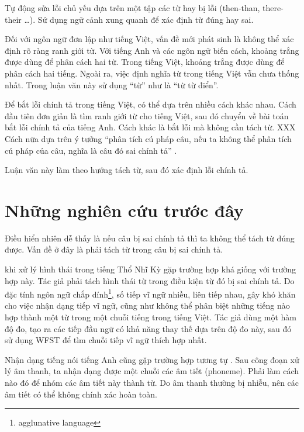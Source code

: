 \documentclass[a4paper]{book} %
\begin{document}
Tự động sửa lỗi chủ yếu dựa trên một tập các từ hay bị lỗi (then-than,
there-their \ldots). Sử dụng ngữ cảnh xung quanh để xác định từ đúng
hay sai.

Đối với ngôn ngữ đơn lập như tiếng Việt, vấn đề mới phát sinh là không
thể xác định rõ ràng ranh giới từ. Với tiếng Anh và các ngôn ngữ biến
cách, khoảng trắng được dùng để phân cách hai từ. Trong tiếng Việt,
khoảng trắng được dùng để phân cách hai tiếng. Ngoài ra, việc định
nghĩa từ trong tiếng Việt vẫn chưa thống nhất. Trong luận văn này sử
dụng ``từ'' như là ``từ từ điển''.

Để bắt lỗi chính tả trong tiếng Việt, có thể dựa trên nhiều cách khác
nhau. Cách đầu tiên đơn giản là tìm ranh giới từ cho tiếng Việt, sau
đó chuyển về bài toán bắt lỗi chính tả của tiếng Anh. Cách khác
là bắt lỗi mà không cần tách từ. XXX
Cách nữa dựa trên ý tưởng ``phân tích cú pháp câu, nếu ta không thể
phân tích cú pháp của câu, nghĩa là câu đó sai chính tả'' \cite{iccc}.

Luận văn này làm theo hướng tách từ, sau đó xác định lỗi chính tả.

\section{Những nghiên cứu trước đây}

Điều hiển nhiên dễ thấy là nếu câu bị sai chính tả thì ta không thể
tách từ đúng được. Vấn đề ở đây là phải tách từ trong câu bị sai chính
tả.

\cite{Oflazer} khi xử lý hình thái trong tiếng Thổ Nhĩ Kỳ gặp trường
hợp khá giống với trường hợp này. Tác giả phải tách hình thái từ
trong điều kiện từ đó bị sai chính tả. Do đặc tính
ngôn ngữ chắp dính\footnote{agglunative language}, số tiếp vĩ ngữ
nhiều, liên tiếp nhau, gây khó khăn cho việc nhận dạng tiếp vĩ ngữ,
cũng như không thể phân biệt những tiếng nào hợp thành một từ trong
một chuỗi tiếng trong tiếng Việt. Tác giả dùng một hàm độ đo, tạo ra
các tiếp đầu ngữ có khả năng thay thế dựa trên độ đo này, sau đó sử
dụng WFST để tìm chuỗi tiếp vĩ ngữ thích hợp nhất.

Nhận dạng tiếng nói tiếng Anh cũng gặp trường hợp tương tự
\cite{Ravishankar}. Sau công 
đoạn xử lý âm thanh, ta nhận dạng được một chuỗi các âm tiết
(phoneme). Phải làm cách nào đó để nhóm các âm tiết này thành từ. Do
âm thanh thường bị nhiễu, nên các âm tiết có thể không chính xác hoàn
toàn.
\end{document}
